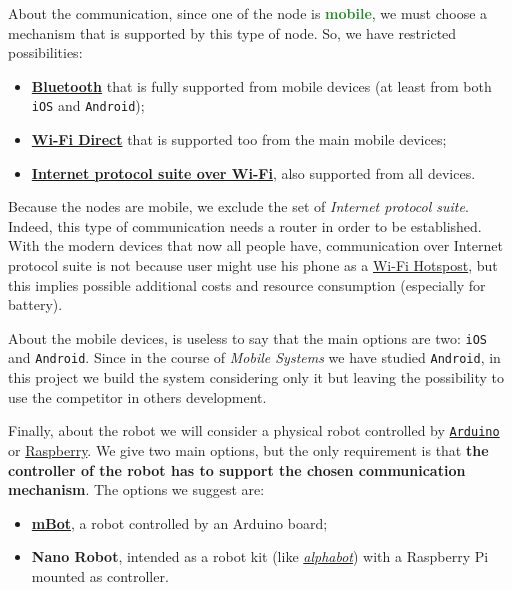 About the communication, since one of the node is \textcolor{ForestGreen}{\textbf{mobile}}, we must choose a mechanism that is supported by this type of node. So, we have restricted possibilities:
\begin{itemize}
	\item \href{https://en.wikipedia.org/wiki/Bluetooth}{\textbf{Bluetooth}} that is fully supported from mobile devices (at least from both \texttt{iOS} and \texttt{Android});
	\item \href{https://en.wikipedia.org/wiki/Wi-Fi_Direct}{\textbf{Wi-Fi Direct}} that is supported too from the main mobile devices;
	\item  \href{https://en.wikipedia.org/wiki/Internet_protocol_suite}{\textbf{Internet protocol suite over Wi-Fi}}, also supported from all devices.
\end{itemize}

Because the nodes are mobile, we exclude the set of \textit{Internet protocol suite}. Indeed, this type of communication needs a router in order to be established.
With the modern devices that now all people have, communication over Internet protocol suite is not because user might use his phone as a \href{https://en.wikipedia.org/wiki/Hotspot_(Wi-Fi)}{Wi-Fi Hotspost}, but this implies possible additional costs and resource consumption (especially for battery).

About the mobile devices, is useless to say that the main options are two: \texttt{iOS} and \texttt{Android}. Since in the course of \textit{Mobile Systems} we have studied \texttt{Android}, in this project we build the system considering only it but leaving the possibility to use the competitor in others development.

Finally, about the robot we will consider a physical robot controlled by \href{https://en.wikipedia.org/wiki/Arduino}{\texttt{Arduino}} or \href{https://en.wikipedia.org/wiki/Raspberry_Pi}{Raspberry}. We give two main options, but the only requirement is that \textbf{the controller of the robot has to support the chosen communication mechanism}.
The options we suggest are:
\begin{itemize}
	\item \href{https://www.makeblock.com/steam-kits/mbot}{\textbf{mBot}}, a robot controlled by an Arduino board;
	\item \textbf{Nano Robot}, intended as a robot kit (like \href{https://www.waveshare.com/alphabot-pi.htm}{\textit{alphabot}}) with a Raspberry Pi mounted as controller.
\end{itemize}

